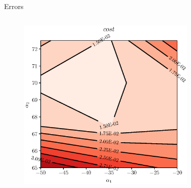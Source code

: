 
\begin{frame}{Errors}
    \begin{columns}
        \begin{figure}
            \centering
            \includegraphics[scale=0.5]{./images/cost.eps}
        \end{figure}
        \begin{figure}

\end{figure}
\end{columns}
\end{frame}
